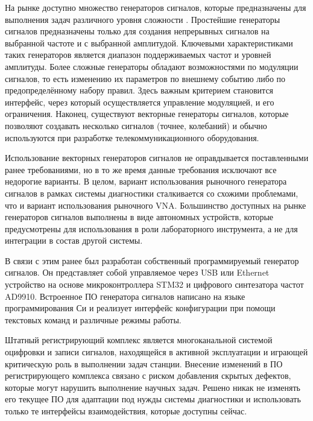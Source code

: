 \documentclass{report}
\begin{document}

На рынке доступно множество генераторов сигналов, которые предназначены для выполнения задач различного уровня сложности \cite{siggen1} \cite{siggen2}. Простейшие генераторы сигналов предназначены только для создания непрерывных сигналов на выбранной частоте и с выбранной амплитудой. Ключевыми характеристиками таких генераторов является диапазон поддерживаемых частот и уровней амплитуды. Более сложные генераторы обладают возможностями по модуляции сигналов, то есть изменению их параметров по внешнему событию либо по предопределённому набору правил. Здесь важным критерием становится интерфейс, через который осуществляется управление модуляцией, и его ограничения. Наконец, существуют векторные генераторы сигналов, которые позволяют создавать несколько сигналов (точнее, колебаний) и обычно используются при разработке телекоммуникационного оборудования.

Использование векторных генераторов сигналов не оправдывается поставленными ранее требованиями, но в то же время данные требования исключают все недорогие варианты. В целом, вариант использования рыночного генератора сигналов в рамках системы диагностики сталкивается со схожими проблемами, что и вариант использования рыночного VNA. Большинство доступных на рынке генераторов сигналов выполнены в виде автономных устройств, которые предусмотрены для использования в роли лабораторного инструмента, а не для интеграции в состав другой системы.

В связи с этим ранее был разработан собственный программируемый генератор сигналов. Он представляет собой управляемое через USB или Ethernet устройство на основе микроконтроллера STM32 и цифрового синтезатора частот AD9910. Встроенное ПО генератора сигналов написано на языке программирования Си и реализует интерфейс конфигурации при помощи текстовых команд и различные режимы работы.

Штатный регистрирующий комплекс является многоканальной системой оцифровки и записи сигналов, находящейся в активной эксплуатации и играющей критическую роль в выполнении  задач станции. Внесение изменений в ПО регистрирующего комплекса связано с риском добавления скрытых дефектов, которые могут нарушить выполнение научных задач. Решено никак не изменять его текущее ПО для адаптации под нужды системы диагностики и использовать только те интерфейсы взаимодействия, которые доступны сейчас.
\end{document}
